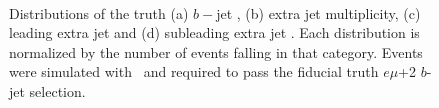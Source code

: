 \begin{figure}
\centering
{}
\\
\caption{Distributions of the truth (a) $b-$jet \pt, (b) extra jet multiplicity, (c) leading extra jet \pt and (d) subleading extra jet \pt. Each distribution is normalized by the number of events falling in that category. Events were simulated with \powpy~\ttbar and required to pass the fiducial truth $e\mu$+2 $b$-jet selection.}
\label{fig:truthnotreco}
\end{figure}

